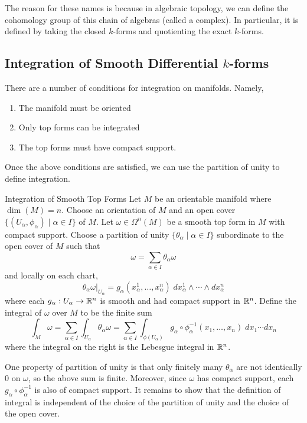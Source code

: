 \documentclass[a4paper]{article}
\begin{document}
The reason for these names is because in algebraic topology, we can define the cohomology group of this chain of algebras (called a complex). In particular, it is defined by taking the closed $k$-forms and quotienting the exact $k$-forms. 

\subsection{Integration of Smooth Differential $k$-forms}
There are a number of conditions for integration on manifolds. Namely, 
\begin{enumerate}
\item The manifold must be oriented
\item Only top forms can be integrated
\item The top forms must have compact support. 
\end{enumerate}

Once the above conditions are satisfied, we can use the partition of unity to define integration.  

\begin{defn}{Integration of Smooth Top Forms}{} Let $M$ be an orientable manifold where $\dim(M)=n$. Choose an orientation of $M$ and an open cover $\{(U_\alpha,\phi_\alpha)\;|\;\alpha\in I\}$ of $M$. Let $\omega\in\Omega^n(M)$ be a smooth top form in $M$ with compact support. Choose a partition of unity $\{\theta_\alpha\;|\;\alpha\in I\}$ subordinate to the open cover of $M$ such that $$\omega=\sum_{\alpha\in I}\theta_\alpha\omega$$ and locally on each chart, $$\theta_\alpha\omega|_{U_\alpha}=g_\alpha(x_\alpha^1,\dots,x_\alpha^n)\;dx_\alpha^1\wedge\cdots\wedge dx_\alpha^n$$ where each $g_\alpha:U_\alpha\to\mathbb{R}^n$ is smooth and had compact support in $\mathbb{R}^n$. Define the integral of $\omega$ over $M$ to be the finite sum $$\int_M\omega=\sum_{\alpha\in I}\int_{U_\alpha}\theta_\alpha\omega=\sum_{\alpha\in I}\int_{\phi(U_\alpha)}g_\alpha\circ\phi_\alpha^{-1}(x_1,\dots,x_n)\;dx_1\cdots dx_n$$ where the integral on the right is the Lebesgue integral in $\mathbb{R}^n$. 
\end{defn}

One property of partition of unity is that only finitely many $\theta_\alpha$ are not identically $0$ on $\omega$, so the above sum is finite. Moreover, since $\omega$ has compact support, each $g_\alpha\circ\phi_\alpha^{-1}$ is also of compact support. It remains to show that the definition of integral is independent of the choice of the partition of unity and the choice of the open cover. 
\end{document}
